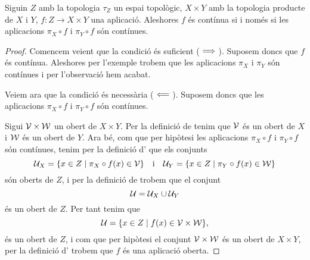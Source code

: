 \documentclass[../../Main.tex]{subfiles}
\begin{document}
	\begin{theorem}
		\label{thm:una aplicació és contínua si i només si les seves components són contínues}
		Siguin \(Z\) amb la topologia \(\tau_{Z}\) un espai topològic, \(X\times Y\) amb la topologia producte de \(X\) i \(Y\), \(f\colon Z\longrightarrow X\times Y\) una aplicació. Aleshores \(f\) és contínua si i només si les aplicacions \(\pi_{X}\circ f\) i \(\pi_{Y}\circ f\) són contínues.
		\begin{proof}
			Comencem veient que la condició és suficient (\(\implies\)). Suposem doncs que \(f\) és contínua. Aleshores per l'exemple  trobem que les aplicacions \(\pi_{X}\) i \(\pi_{Y}\) són contínues i per l'observació  hem acabat.
			
			Veiem ara que la condició és necessària (\(\impliedby\)). Suposem doncs que les aplicacions \(\pi_{X}\circ f\) i \(\pi_{Y}\circ f\) són contínues.
			
			Sigui \(\mathcal{V}\times\mathcal{W}\) un obert de \(X\times Y\). Per la definició de  tenim que \(\mathcal{V}\) és un obert de \(X\) i \(\mathcal{W}\) és un obert de \(Y\). Ara bé, com que per hipòtesi les aplicacions \(\pi_{X}\circ f\) i \(\pi_{Y}\circ f\) són contínues, tenim per la definició d' que els conjunts
			\[\mathcal{U}_{X}=\{x\in Z\mid \pi_{X}\circ f(x)\in\mathcal{V}\}\quad\text{i}\quad
			\mathcal{U}_{Y}=\{x\in Z\mid \pi_{Y}\circ f(x)\in\mathcal{W}\}\]
			són oberts de \(Z\), i per la definició de  trobem que el conjunt
			\[
			    \mathcal{U}=\mathcal{U}_{X}\cup\mathcal{U}_{Y}
			\]
			és un obert de \(Z\). Per tant tenim que
			\[
			    \mathcal{U}=\{x\in Z\mid f(x)\in\mathcal{V}\times\mathcal{W}\},
			\]
			és un obert de \(Z\), i com que per hipòtesi el conjunt \(\mathcal{V}\times\mathcal{W}\) és un obert de \(X\times Y\), per la definició d' trobem que \(f\) és una aplicació oberta. %
		\end{proof}
	\end{theorem}
\end{document}
